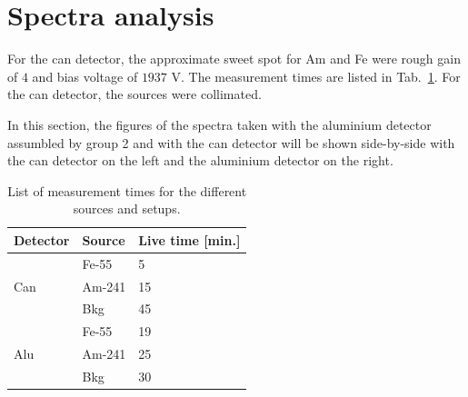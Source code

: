 \section{Spectra analysis}
\label{sec:spectraanalysis}
For the can detector, the approximate sweet spot for Am and Fe were rough gain of $4$ and bias voltage of $1937$ V. The measurement times are listed in Tab.~\ref{tab:measurementstimes}. For the can detector, the sources were collimated.

In this section, the figures of the spectra taken with the aluminium detector assumbled by group 2 and with the can detector will be shown side-by-side with the can detector on the left and the aluminium detector on the right.

\begin{table}[htb]
  \centering
\begin{tabular}{lll}
\textbf{Detector}    & \textbf{Source} & \textbf{Live time {[}min.{]}} \\ \hline
\multirow{3}{*}{Can} & Fe-55           & 5                          \\
                     & Am-241          & 15                         \\
                     & Bkg             & 45                         \\ \hline
\multirow{3}{*}{Alu} & Fe-55           & 19                         \\
                     & Am-241          & 25                         \\
                     & Bkg             & 30                         \\ \hline
\end{tabular}
\caption{List of measurement times for the different sources and setups.}
\label{tab:measurementstimes}
\end{table}

